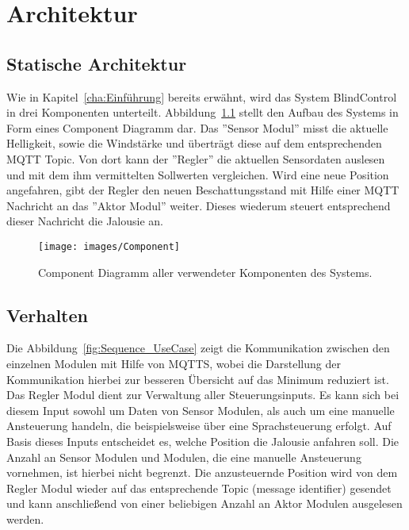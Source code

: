 \chapter{Architektur}
\label{cha:Architektur}

\section{Statische Architektur}
Wie in Kapitel~\ref{cha:Einführung} bereits erwähnt, wird das System BlindControl in drei Komponenten unterteilt. Abbildung~\ref{fig:component_diagramm} stellt den Aufbau des Systems in Form eines Component Diagramm dar. Das ''Sensor Modul'' misst die aktuelle Helligkeit, sowie die Windstärke und überträgt diese auf dem entsprechenden MQTT Topic. Von dort kann der ''Regler'' die aktuellen Sensordaten auslesen und mit dem ihm vermittelten Sollwerten vergleichen. Wird eine neue Position angefahren, gibt der Regler den neuen Beschattungsstand mit Hilfe einer MQTT Nachricht an das ''Aktor Modul'' weiter. Dieses wiederum steuert entsprechend dieser Nachricht die Jalousie an.
\begin{figure}[hbt]
	\centering
	\texttt{[image: images/Component]}
	\caption[Component Diagramm]{Component Diagramm aller verwendeter Komponenten des Systems.}
	\label{fig:component_diagramm}
\end{figure}

\section{Verhalten}
Die Abbildung~\ref{fig:Sequence_UseCase} zeigt die Kommunikation zwischen den einzelnen Modulen mit Hilfe von MQTTS, wobei die Darstellung der Kommunikation hierbei zur besseren Übersicht auf das Minimum reduziert ist. Das Regler Modul dient zur Verwaltung aller Steuerungsinputs. Es kann sich bei diesem Input sowohl um Daten von Sensor Modulen, als auch um eine manuelle Ansteuerung handeln, die beispielsweise über eine Sprachsteuerung erfolgt. Auf Basis dieses Inputs entscheidet es, welche Position die Jalousie anfahren soll. Die Anzahl an Sensor Modulen und Modulen, die eine manuelle Ansteuerung vornehmen, ist hierbei nicht begrenzt. Die anzusteuernde Position wird von dem Regler Modul wieder auf das entsprechende Topic (message identifier) gesendet und kann anschließend von einer beliebigen Anzahl an Aktor Modulen ausgelesen werden.

